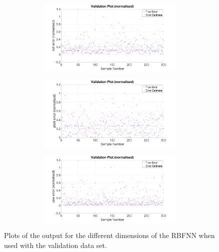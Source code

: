 \begin{figure}
\begin{subfigure}{0.48\textwidth}
\begin{subfigure}{\textwidth}
    \end{subfigure}
    \caption{}
  \end{subfigure}
  \begin{subfigure}{0.48\textwidth}
    \begin{subfigure}{\textwidth}
      \includegraphics[clip, trim = 80 0 100 0, width=\textwidth]{figures/chapter4/v_roll}
    \end{subfigure}
    \begin{subfigure}{\textwidth}
      \includegraphics[clip, trim = 80 0 100 0, width=\textwidth]{figures/chapter4/v_pitch}
    \end{subfigure}
    \begin{subfigure}{\textwidth}
      \includegraphics[clip, trim = 80 0 100 0, width=\textwidth]{figures/chapter4/v_yaw}
    \end{subfigure}
    \caption{}
  \end{subfigure}
  \caption[The output of the RBFNN with the validation set input.]{Plots of the output for the different dimensions of the RBFNN when used with the validation data set.}
  \label{fig:chap4-rbf-valid}
\end{figure}

